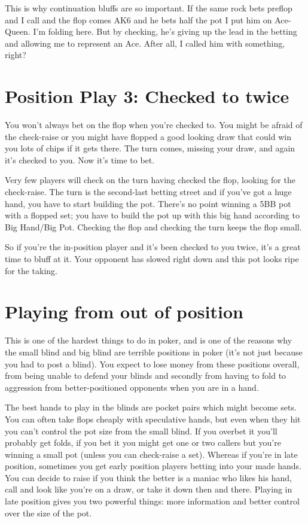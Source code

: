 This is why continuation bluffs are so important. If the same rock bets
preflop and I call and the flop comes AK6 and he bets half the pot
I put him on Ace-Queen. I'm folding here. But by checking, he's giving
up the lead in the betting and allowing me to represent an Ace. After
all, I called him with something, right?

\section{Position Play 3: Checked to twice}

You won't always bet on the flop when you're checked to. You might
be afraid of the check-raise or you might have flopped a good looking
draw that could win you lots of chips if it gets there. The turn comes,
missing your draw, and again it's checked to you. Now it's time to bet.

Very few players will check on the turn having checked the flop,
looking for the check-raise. The turn is the second-last betting
street and if you've got a huge hand, you have to start building the pot.
There's no point winning a 5BB pot with a flopped set; you have to
build the pot up with this big hand according to Big Hand/Big Pot.
Checking the flop and checking the turn keeps the flop small.

So if you're the in-position player and it's been checked to you twice,
it's a great time to bluff at it. Your opponent has slowed right down
and this pot looks ripe for the taking.


\section{Playing from out of position}

This is one of the hardest things to do in poker, and is one of
the reasons why the small blind and big blind are
terrible positions in poker (it's not just because you had to post
a blind). You expect to lose money from these
positions overall, from being unable to defend your blinds and secondly
from having to fold to aggression from better-positioned opponents when you
are in a hand.

The best hands to play in the blinds are pocket pairs which might become
sets. You can often take flops cheaply with speculative hands, but even
when they hit you can't control the pot size from the small blind. If you
overbet it you'll probably get folds, if you bet it you might get one or
two callers but you're winning a small pot (unless you can check-raise
a set). Whereas if you're in late position, sometimes you get early
position players betting into your made hands. You can decide to raise
if you think the better is a maniac who likes his hand, call and look
like you're on a draw, or take it down then and there. Playing in late
position gives you two powerful things: more information and better control
over the size of the pot.

